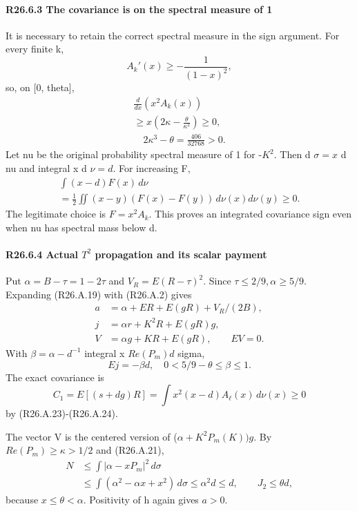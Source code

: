 \paragraph{R26.6.3 The covariance is on the spectral measure of 1}

It is necessary to retain the correct spectral measure in the sign
argument. For every finite k,
\[
A_k'(x)\ge-\frac1{(1-x)^2},
\]
so, on [0, theta],
\[
\begin{gathered}
\frac{d}{dx}(x^2A_k(x))\\
\ge x\left(2\kappa-\frac{\theta}{\kappa^2}\right)\ge0,\\
\quad 2\kappa^3-\theta=\frac{406}{32768}>0.
\end{gathered}\tag{R26.A.23}
\]
Let nu be the original probability spectral measure of 1 for -\(K^2.\)
Then d \(\sigma=x\) d nu and integral x d \(\nu=d.\) For increasing F,
\[
\begin{gathered}
\int(x-d)F(x)\,d\nu\\
=\tfrac12\iint(x-y)(F(x)-F(y))\,d\nu(x)d\nu(y)\ge0.
\end{gathered}\tag{R26.A.24}
\]
The legitimate choice is \(F=x^2A_k.\) This proves an integrated covariance
sign even when nu has spectral mass below d.

\paragraph{R26.6.4 Actual \(T^2\) propagation and its scalar payment}

Put \(\alpha=B-\tau=1-2\tau\) and \(V_R=E(R-\tau)^2.\) Since \(\tau\le 2/9,\allowbreak  \alpha\ge 5/9.\) Expanding (R26.A.19) with (R26.A.2) gives
\[
\begin{aligned}
a&=\alpha+ER+E(gR)+V_R/(2B),\\
j&=\alpha r+K^2R+E(gR)g,\\
V&=\alpha g+KR+E(gR),\qquad EV=0.
\end{aligned}                                                        \tag{R26.A.25}
\]
With \(\beta=\alpha- d^{-1}\) integral x \(Re(P_m)d\) sigma,
\[
Ej=-\beta d,\quad 0<5/9-\theta\le\beta\le1.
\]
The exact covariance is
\[
C_1=E[(s+dg)R]
=\int x^2(x-d)A_\ell(x)\,d\nu(x)\ge0
\]
by (R26.A.23)-(R26.A.24).

The vector V is the centered version of
(\(\alpha+K^2P_m(K))g.\) By \(Re(P_m)\ge \kappa>1/2\) and (R26.A.21),
\[
\begin{aligned}
N&\le\int|\alpha-xP_m|^2\,d\sigma\\
&\le\int(\alpha^2-\alpha x+x^2)\,d\sigma
\le\alpha^2d\le d,\qquad J_2\le\theta d,
\end{aligned}
\]
because \(x\le \theta<\alpha.\) Positivity of h again gives \(a>0.\)

